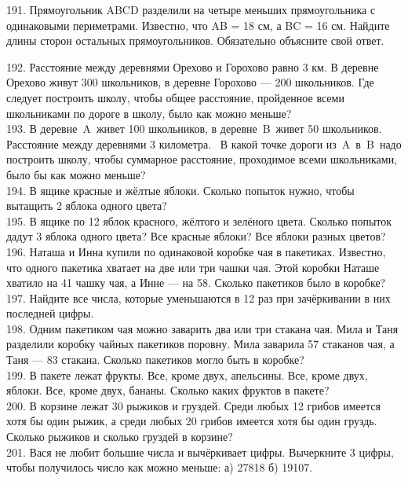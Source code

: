 191. Прямоугольник ABCD разделили на четыре меньших прямоугольника с одинаковыми периметрами. Известно, что AB = 18 см, а BC = 16 см. Найдите длины сторон остальных прямоугольников. Обязательно объясните свой ответ.
\begin{center}
\begin{figure}[ht!]
\end{figure}
\end{center}
192. Расстояние между деревнями Орехово и Горохово равно 3 км. В деревне Орехово живут 300 школьников, в деревне Горохово --- 200 школьников. Где следует построить школу, чтобы общее расстояние, пройденное всеми школьниками по дороге в школу, было как можно меньше?\\
193. В деревне A живет 100 школьников, в деревне B живет 50 школьников. Расстояние между деревнями 3 километра. 
В какой точке дороги из A в B надо построить школу, чтобы суммарное расстояние, проходимое всеми школьниками, было бы как можно меньше?\\
194. В ящике красные и жёлтые яблоки. Сколько попыток нужно, чтобы вытащить 2 яблока одного цвета?\\
195. В ящике по 12 яблок красного, жёлтого и зелёного цвета. Сколько попыток дадут 3 яблока одного цвета? Все красные яблоки? Все яблоки разных цветов?\\
196. Наташа и Инна купили по одинаковой коробке чая в пакетиках. Известно, что одного пакетика хватает на две или три чашки чая. Этой коробки Наташе хватило на 41 чашку чая, а Инне --- на 58. Сколько пакетиков было в коробке?\\
197. Найдите все числа, которые уменьшаются в 12 раз при зачёркивании в них последней цифры.\\
198. Одним пакетиком чая можно заварить два или три стакана чая. Мила и Таня разделили коробку чайных пакетиков поровну. Мила заварила 57 стаканов чая, а Таня --- 83 стакана. Сколько пакетиков могло быть в коробке?\\
199. В пакете лежат фрукты. Все, кроме двух, апельсины. Все, кроме двух, яблоки. Все, кроме двух, бананы. Сколько каких фруктов в пакете?\\
200. В корзине лежат 30 рыжиков и груздей. Среди любых 12 грибов имеется хотя бы один рыжик, а среди любых 20 грибов имеется хотя бы один груздь. Сколько рыжиков и сколько груздей в корзине?\\
201. Вася не любит большие числа и вычёркивает цифры. Вычеркните 3 цифры, чтобы получилось число как можно меньше: а) 27818 б) 19107.\\
